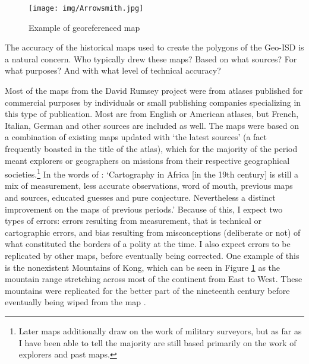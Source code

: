 \documentclass[12pt]{article}
\begin{document}

\begin{figure}[h!tpb]
	\centering
	\texttt{[image: img/Arrowsmith.jpg]}
	\caption{Example of georeferenced map}%
	\label{Arrowsmith}
\end{figure}


The accuracy of the historical maps used to create the polygons of the Geo-ISD
is a natural concern. Who typically drew these maps? Based on what sources? For
what purposes? And with what level of technical accuracy? 

Most of the maps from the David Rumsey project were from atlases published for
commercial purposes by individuals or small publishing companies specializing in
this type of publication. Most are from English or American atlases, but French,
Italian, German and other sources are included as well. The maps were based on a
combination of existing maps updated with `the latest sources' (a fact
frequently boasted in the title of the atlas), which for the majority of the
period meant explorers or geographers on missions from their respective
geographical societies.\footnote{Later maps additionally draw on the work of
military surveyors, but as far as I have been able to tell the majority are
still based primarily on the work of explorers and past maps.} In the words of
\citet[47-48]{Stone1995}: `Cartography in Africa [in the 19th century] is still
a mix of measurement, less accurate observations, word of mouth, previous maps
and sources, educated guesses and pure conjecture. Nevertheless a distinct
improvement on the maps of previous periods.' Because of this, I expect two
types of errors: errors resulting from measurement, that is technical or
cartographic errors, and bias resulting from misconceptions (deliberate or not)
of what constituted the borders of a polity at the time. I also expect errors to
be replicated by other maps, before eventually being corrected. One example of
this is the nonexistent Mountains of Kong, which can be seen in Figure
\ref{Arrowsmith} as the mountain range stretching across most of the continent
from East to West. These mountains were replicated for the better part of the
nineteenth century before eventually being wiped from the map
\citep{Bassett_1991}.
\end{document}
